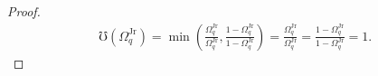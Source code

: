 \documentclass[hidelinks, nonatbib]{elsarticle}
\begin{document}
\begin{lemma}
\begin{proof}
        \begin{align}
            \mho(\Omega_{q}^{\text{Jr}}) 
            =
            \min\left(
                \frac{
                    \Omega_{q}^{\text{Jr}}
                }{
                    \Omega_{q}^{\text{Jr}}
                }
                ,
                \frac{
                    1 - \Omega_{q}^{\text{Jr}}
                }{
                    1 - \Omega_{q}^{\text{Jr}}
                }
            \right)
            =
            \frac{
                \Omega_{q}^{\text{Jr}}
            }{
                \Omega_{q}^{\text{Jr}}
            }
            =
            \frac{
                1 - \Omega_{q}^{\text{Jr}}
            }{
                1 - \Omega_{q}^{\text{Jr}}
            }
            =
            1
            .
        \end{align}
        

\end{proof}
\end{lemma}
\end{document}
